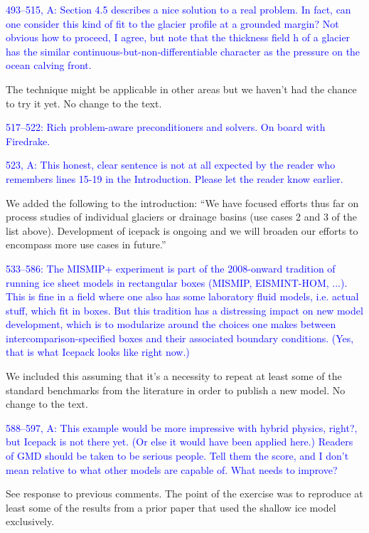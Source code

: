 \documentclass{article}
\theoremstyle{definition}
\theoremstyle{plain}
\begin{document}
\textcolor{blue}{493--515, A:  Section 4.5 describes a nice solution to a real problem.  In fact, can one consider this kind of fit to the glacier profile at a grounded margin?  Not obvious how to proceed, I agree, but note that the thickness field h of a glacier has the similar continuous-but-non-differentiable character as the pressure on the ocean calving front.}

The technique might be applicable in other areas but we haven't had the chance to try it yet.
No change to the text.

\textcolor{blue}{517--522:  Rich problem-aware preconditioners and solvers.  On board with Firedrake.}

\textcolor{blue}{523, A:  This honest, clear sentence is not at all expected by the reader who remembers lines 15-19 in the Introduction.  Please let the reader know earlier.}

We added the following to the introduction: ``We have focused efforts thus far on process studies of individual glaciers or drainage basins (use cases 2 and 3 of the list above).
Development of icepack is ongoing and we will broaden our efforts to encompass more use cases in future.''

\textcolor{blue}{533--586:  The MISMIP+ experiment is part of the 2008-onward tradition of running ice sheet models in rectangular boxes (MISMIP, EISMINT-HOM, ...).  This is fine in a field where one also has some laboratory fluid models, i.e. actual stuff, which fit in boxes.  But this tradition has a distressing impact on new model development, which is to modularize around the choices one makes between intercomparison-specified boxes and their associated boundary conditions.  (Yes, that is what Icepack looks like right now.)}

We included this assuming that it's a necessity to repeat at least some of the standard benchmarks from the literature in order to publish a new model.
No change to the text.

\textcolor{blue}{588--597, A:  This example would be more impressive with hybrid physics, right?, but Icepack is not there yet.  (Or else it would have been applied here.)  Readers of GMD should be taken to be serious people.  Tell them the score, and I don't mean relative to what other models are capable of.  What needs to improve?}

See response to previous comments.
The point of the exercise was to reproduce at least some of the results from a prior paper that used the shallow ice model exclusively.
\end{document}
